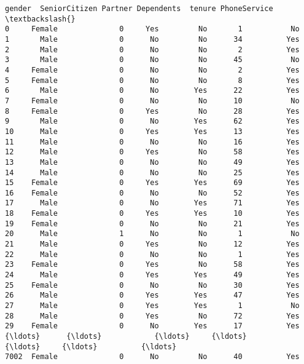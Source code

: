 \documentclass[11pt]{article}
\newcommand{\prompt}[4]{
        \llap{{\color{#2}[#3]: #4}}\vspace{-1.25em}
    }
\begin{document}
            \begin{tcolorbox}[breakable, boxrule=.5pt, size=fbox, pad at break*=1mm, opacityfill=0]
\prompt{Out}{outcolor}{7}{\hspace{3.5pt}}
\begin{Verbatim}[commandchars=\\\{\}]
      gender  SeniorCitizen Partner Dependents  tenure PhoneService  \textbackslash{}
0     Female              0     Yes         No       1           No
1       Male              0      No         No      34          Yes
2       Male              0      No         No       2          Yes
3       Male              0      No         No      45           No
4     Female              0      No         No       2          Yes
5     Female              0      No         No       8          Yes
6       Male              0      No        Yes      22          Yes
7     Female              0      No         No      10           No
8     Female              0     Yes         No      28          Yes
9       Male              0      No        Yes      62          Yes
10      Male              0     Yes        Yes      13          Yes
11      Male              0      No         No      16          Yes
12      Male              0     Yes         No      58          Yes
13      Male              0      No         No      49          Yes
14      Male              0      No         No      25          Yes
15    Female              0     Yes        Yes      69          Yes
16    Female              0      No         No      52          Yes
17      Male              0      No        Yes      71          Yes
18    Female              0     Yes        Yes      10          Yes
19    Female              0      No         No      21          Yes
20      Male              1      No         No       1           No
21      Male              0     Yes         No      12          Yes
22      Male              0      No         No       1          Yes
23    Female              0     Yes         No      58          Yes
24      Male              0     Yes        Yes      49          Yes
25    Female              0      No         No      30          Yes
26      Male              0     Yes        Yes      47          Yes
27      Male              0     Yes        Yes       1           No
28      Male              0     Yes         No      72          Yes
29    Female              0      No        Yes      17          Yes
{\ldots}      {\ldots}            {\ldots}     {\ldots}        {\ldots}     {\ldots}          {\ldots}
7002  Female              0      No         No      40          Yes

\end{Verbatim}
\end{tcolorbox}
\end{document}
